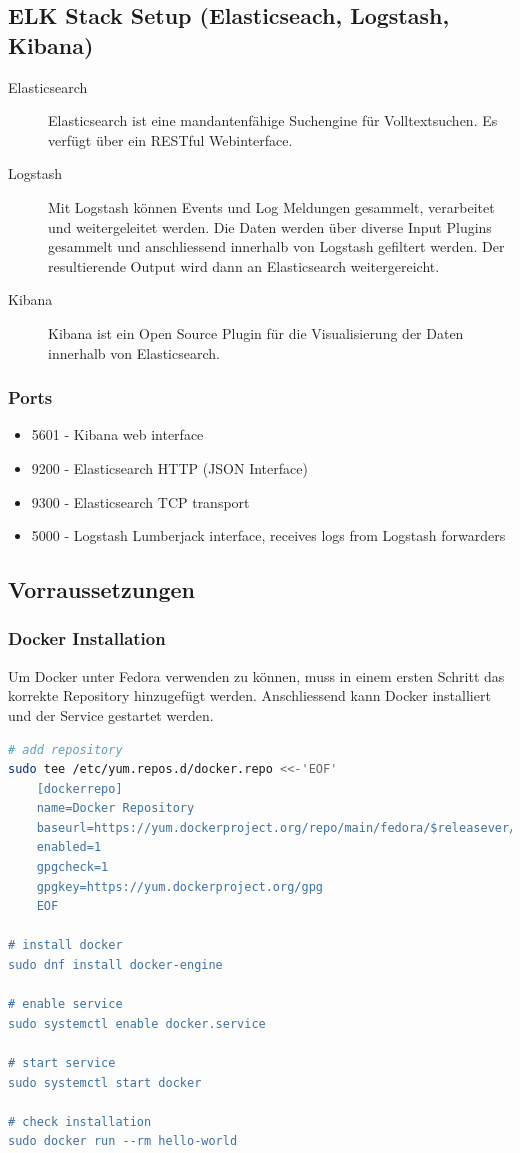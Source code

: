 \subsection{ELK Stack Setup (Elasticseach, Logstash, Kibana)}
\begin{description}
	\item[Elasticsearch] Elasticsearch ist eine mandantenfähige Suchengine für Volltextsuchen. Es verfügt über ein RESTful Webinterface.
	\item[Logstash] Mit Logstash können Events und Log Meldungen gesammelt, verarbeitet und weitergeleitet werden. Die Daten werden über diverse Input Plugins gesammelt und anschliessend innerhalb von Logstash gefiltert werden. Der resultierende Output wird dann an Elasticsearch weitergereicht.
	\item[Kibana] Kibana ist ein Open Source Plugin für die Visualisierung der Daten innerhalb von Elasticsearch. 
\end{description}

\subsubsection{Ports}
\begin{itemize}
	\item 5601 - Kibana web interface
	\item 9200 - Elasticsearch HTTP (JSON Interface)
	\item 9300 - Elasticsearch TCP transport
	\item 5000 - Logstash Lumberjack interface, receives logs from Logstash forwarders
\end{itemize}

\subsection{Vorraussetzungen}
\subsubsection{Docker Installation}
Um Docker unter Fedora verwenden zu können, muss in einem ersten Schritt das korrekte Repository hinzugefügt werden. Anschliessend kann Docker installiert und der Service gestartet werden.
\begin{lstlisting}[language=bash]
# add repository
sudo tee /etc/yum.repos.d/docker.repo <<-'EOF'
	[dockerrepo]
	name=Docker Repository
	baseurl=https://yum.dockerproject.org/repo/main/fedora/$releasever/
	enabled=1
	gpgcheck=1
	gpgkey=https://yum.dockerproject.org/gpg
	EOF

# install docker
sudo dnf install docker-engine

# enable service
sudo systemctl enable docker.service

# start service
sudo systemctl start docker

# check installation
sudo docker run --rm hello-world
\end{lstlisting}

